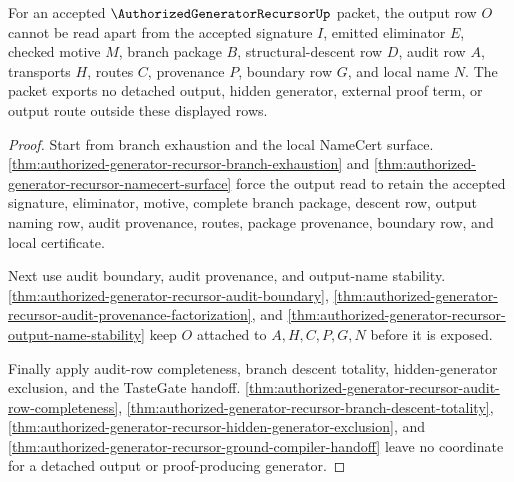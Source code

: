 \begin{theorem}
\label{thm:authorized-generator-recursor-output-boundary-nonescape}
For an accepted $\AuthorizedGeneratorRecursorUp$ packet, the output row $O$ cannot be read apart from the accepted signature $I$, emitted eliminator $E$, checked motive $M$, branch package $B$, structural-descent row $D$, audit row $A$, transports $H$, routes $C$, provenance $P$, boundary row $G$, and local name $N$. The packet exports no detached output, hidden generator, external proof term, or output route outside these displayed rows.
\end{theorem}
\begin{proof}
Start from branch exhaustion and the local NameCert surface. \autoref{thm:authorized-generator-recursor-branch-exhaustion} and \autoref{thm:authorized-generator-recursor-namecert-surface} force the output read to retain the accepted signature, eliminator, motive, complete branch package, descent row, output naming row, audit provenance, routes, package provenance, boundary row, and local certificate.

Next use audit boundary, audit provenance, and output-name stability. \autoref{thm:authorized-generator-recursor-audit-boundary}, \autoref{thm:authorized-generator-recursor-audit-provenance-factorization}, and \autoref{thm:authorized-generator-recursor-output-name-stability} keep $O$ attached to $A,H,C,P,G,N$ before it is exposed.

Finally apply audit-row completeness, branch descent totality, hidden-generator exclusion, and the TasteGate handoff. \autoref{thm:authorized-generator-recursor-audit-row-completeness}, \autoref{thm:authorized-generator-recursor-branch-descent-totality}, \autoref{thm:authorized-generator-recursor-hidden-generator-exclusion}, and \autoref{thm:authorized-generator-recursor-ground-compiler-handoff} leave no coordinate for a detached output or proof-producing generator.
\end{proof}


